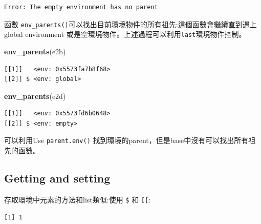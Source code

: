 \documentclass[]{book}
\newenvironment{Shaded}{\begin{snugshade}}{\end{snugshade}}
\newcommand{\DataTypeTok}[1]{\textcolor[rgb]{0.13,0.29,0.53}{#1}}
\newcommand{\DecValTok}[1]{\textcolor[rgb]{0.00,0.00,0.81}{#1}}
\newcommand{\KeywordTok}[1]{\textcolor[rgb]{0.13,0.29,0.53}{\textbf{#1}}}
\newcommand{\NormalTok}[1]{#1}
\newcommand{\OperatorTok}[1]{\textcolor[rgb]{0.81,0.36,0.00}{\textbf{#1}}}
\newcommand{\StringTok}[1]{\textcolor[rgb]{0.31,0.60,0.02}{#1}}
\theoremstyle{definition}
\theoremstyle{definition}
\theoremstyle{definition}
\theoremstyle{remark}
\begin{document}
\begin{verbatim}
Error: The empty environment has no parent
\end{verbatim}

函數
\texttt{env\_parents()}可以找出目前環境物件的所有祖先:這個函數會繼續直到遇上global
environment 或是空環境物件。上述過程可以利用\texttt{last}環境物件控制。

\begin{Shaded}
\begin{Highlighting}[]
\KeywordTok{env_parents}\NormalTok{(e2b)}
\end{Highlighting}
\end{Shaded}

\begin{verbatim}
[[1]]   <env: 0x5573fa7b8f68>
[[2]] $ <env: global>
\end{verbatim}

\begin{Shaded}
\begin{Highlighting}[]
\KeywordTok{env_parents}\NormalTok{(e2d)}
\end{Highlighting}
\end{Shaded}

\begin{verbatim}
[[1]]   <env: 0x5573fd6b0648>
[[2]] $ <env: empty>
\end{verbatim}

可以利用Use \texttt{parent.env()}
找到環境的parent，但是base中沒有可以找出所有祖先的函數。

\hypertarget{getting-and-setting}{%
\subsection{Getting and setting}\label{getting-and-setting}}

存取環境中元素的方法和list類似:使用 \texttt{\$} 和 \texttt{{[}{[}}:

\begin{Shaded}
\end{Shaded}

\begin{verbatim}
[1] 1
\end{verbatim}

\begin{Shaded}
\end{Shaded}
\end{document}

